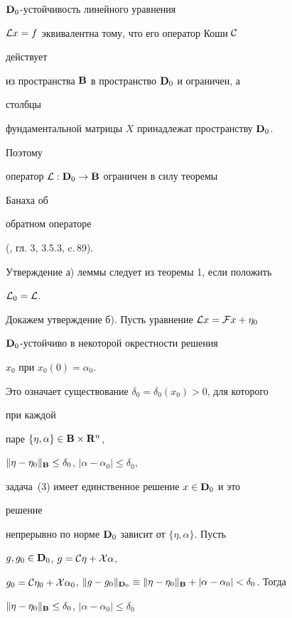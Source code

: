 \begin{pf}


$\bold {D}_0$-устойчивость линейного уравнения


${\cal L}x=f$ эквивалентна тому, что его оператор Коши $\cal C$


действует


из пространства $\bold {B}$ в пространство $\bold {D}_0$ и ограничен, а


столбцы


фундаментальной матрицы $X$ принадлежат пространству $\bold {D}_0$.


Поэтому


оператор ${\cal L}:\bold {D}_0\to\bold {B}$ ограничен в силу теоремы


Банаха об


обратном операторе


(\cite{11}, гл. 3, 3.5.3, c.\,89).





Утверждение а) леммы следует из теоремы 1, если положить


${\cal L}_0={\cal L}$.





Докажем утверждение б). Пусть уравнение ${\cal L}x={\cal


F}x+\eta_0$\;


$\bold {D}_0$-устойчиво в некоторой окрестности решения


$x_0$ при $x_0(0)=\alpha_0$.


Это означает существование $\delta_0=\delta_0(x_0)>0$, для которого


при каждой


паре $\{\eta,\alpha\}\in\bold {B}\times\bold {R}^n$,


$\|\eta-\eta_0\|_{\bold B}\le\delta_0$, $|\alpha-\alpha_0|\le\delta_0$,


задача~(3) имеет единственное решение $x\in\bold {D}_0$ и это


решение


непрерывно по норме $\bold {D}_0$ зависит от $\{\eta,\alpha\}$. Пусть


$g,g_0\in\bold {D}_0$, $g={\cal C}\eta+{\cal X}\alpha$,


$g_0={\cal C}\eta_0+{\cal X}\alpha_0$, $\|g-g_0\|_{\bold{D}_0}\equiv


\|\eta-\eta_0\|_{\bold B}+|\alpha-\alpha_0|<\delta_0$. Тогда


$\|\eta-\eta_0\|_{\bold B}\le\delta_0$, $|\alpha-\alpha_0|\le\delta_0$



\end{pf}
